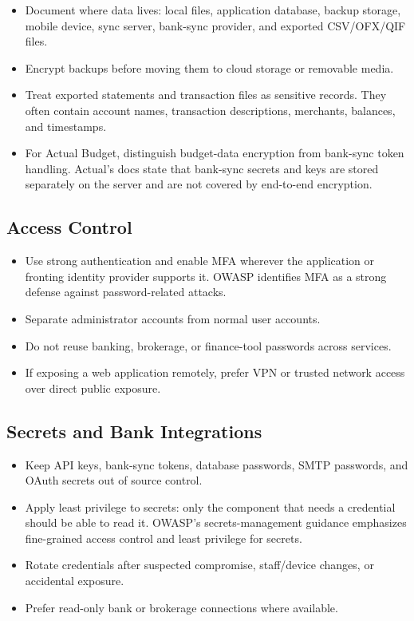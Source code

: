 \documentclass[11pt]{article}
\begin{document}
\begin{itemize}
  \item Document where data lives: local files, application database, backup storage, mobile device, sync server, bank-sync provider, and exported CSV/OFX/QIF files.
  \item Encrypt backups before moving them to cloud storage or removable media.
  \item Treat exported statements and transaction files as sensitive records. They often contain account names, transaction descriptions, merchants, balances, and timestamps.
  \item For Actual Budget, distinguish budget-data encryption from bank-sync token handling. Actual's docs state that bank-sync secrets and keys are stored separately on the server and are not covered by end-to-end encryption.\cite{actual-bank-sync}
\end{itemize}

\subsection{Access Control}

\begin{itemize}
  \item Use strong authentication and enable MFA wherever the application or fronting identity provider supports it. OWASP identifies MFA as a strong defense against password-related attacks.\cite{owasp-mfa,owasp-auth}
  \item Separate administrator accounts from normal user accounts.
  \item Do not reuse banking, brokerage, or finance-tool passwords across services.
  \item If exposing a web application remotely, prefer VPN or trusted network access over direct public exposure.
\end{itemize}

\subsection{Secrets and Bank Integrations}

\begin{itemize}
  \item Keep API keys, bank-sync tokens, database passwords, SMTP passwords, and OAuth secrets out of source control.
  \item Apply least privilege to secrets: only the component that needs a credential should be able to read it. OWASP's secrets-management guidance emphasizes fine-grained access control and least privilege for secrets.\cite{owasp-secrets}
  \item Rotate credentials after suspected compromise, staff/device changes, or accidental exposure.
  \item Prefer read-only bank or brokerage connections where available.
\end{itemize}
\end{document}
